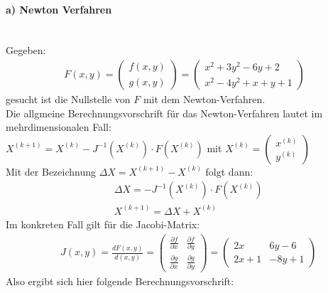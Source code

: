 \paragraph*{a) Newton Verfahren}\hfill\\ Gegeben:
\begin{align*}
  F(x, y) = \begin{pmatrix}f(x,y) \\ g(x,y)\end{pmatrix} =
  \begin{pmatrix}x^2 +3 y^2 - 6 y + 2 \\ x^2 - 4 y^2 + x + y + 1\end{pmatrix}
\end{align*}
gesucht ist die Nullstelle von $F$ mit dem Newton-Verfahren.\\
\newline
Die allgmeine Berechnungsvorschrift für das Newton-Verfahren lautet im mehrdimensionalen Fall:\\ $X^{(k+1)} = X^{(k)} - J^{-1}(X^{(k)}) \cdot F(X^{(k)})$ mit $X^{(k)} = \begin{pmatrix}x^{(k)} \\ y^{(k)} \end{pmatrix}$\\
Mit der Bezeichnung $\Delta X=X^{(k+1)} - X^{(k)}$ folgt dann:
\begin{align*}
&\Delta X=- J^{-1}(X^{(k)}) \cdot F(X^{(k)})\\
&X^{(k+1)}=\Delta X + X^{(k)}
\end{align*}
Im konkreten Fall gilt für die Jacobi-Matrix:
\begin{align*}
 & J(x,y) = \frac{dF(x,y)}{d(x,y)} =
\begin{pmatrix}\frac{\partial f}{\partial x}& \frac{\partial f}{\partial y}\\
  \frac{\partial g}{\partial x}& \frac{\partial g}{\partial y} \end{pmatrix} =
\begin{pmatrix}2 x & 6 y - 6 \\ 2 x + 1 & -8 y + 1 \end{pmatrix}
\end{align*}
Also ergibt sich hier folgende Berechnungsvorschrift:
